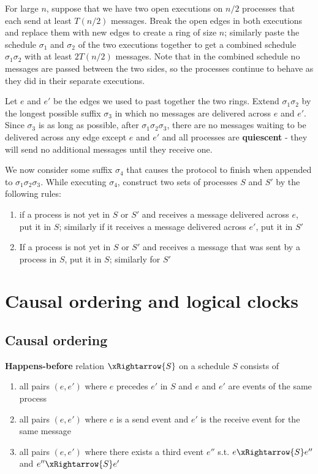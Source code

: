 \documentclass[11pt]{article}
\begin{document}
For large \(n\), suppose that we have two open executions on \(n/2\) processes that each send at least
\(T(n/2)\) messages. Break the open edges in both executions and replace them with new edges to create
a ring of size \(n\); similarly paste the schedule \(\sigma_1\) and \(\sigma_2\) of the two executions together to
get a combined schedule \(\sigma_1\sigma_2\) with at least \(2T(n/2)\) messages. Note that in the combined
schedule no messages are passed between the two sides, so the processes continue to behave as they did
in their separate executions.

Let \(e\) and \(e'\) be the edges we used to past together the two rings. Extend \(\sigma_1\sigma_2\) by the
longest possible suffix \(\sigma_3\) in which no messages are delivered across \(e\) and \(e'\). Since
\(\sigma_3\) is as long as possible, after \(\sigma_1\sigma_2\sigma_3\), there are no messages waiting to be delivered across
any edge except \(e\) and \(e'\) and all processes are \textbf{quiescent} - they will send no additional
messages until they receive one.

We now consider some suffix \(\sigma_4\) that causes the protocol to finish when appended to \(\sigma_1\sigma_2\sigma_3\).
While executing \(\sigma_4\), construct two sets of processes \(S\) and \(S'\) by the following rules:
\begin{enumerate}
\item if a process is not yet in \(S\) or \(S'\) and receives a message delivered across \(e\), put it in
\(S\); similarly if it receives a message delivered across \(e'\), put it in \(S'\)
\item If a process is not yet in \(S\) or \(S'\) and receives a message that was sent by a process in
\(S\), put it in \(S\); similarly for \(S'\)
\end{enumerate}
\section{Causal ordering and logical clocks}
\label{sec:org0ff7a93}
\subsection{Causal ordering}
\label{sec:orgffd09ed}
\textbf{Happens-before} relation \(\xRightarrow{S}\) on a schedule \(S\) consists of
\begin{enumerate}
\item all pairs \((e,e')\) where \(e\) precedes \(e'\) in \(S\) and \(e\) and \(e'\) are events of the
same process
\item all pairs \((e,e')\) where \(e\) is a send event and \(e'\) is the receive event for the same message
\item all pairs \((e,e')\) where there exists a third event \(e''\) s.t. \(e\xRightarrow{S}e''\) and \(e''\xRightarrow{S}e'\)
\end{enumerate}
\end{document}
